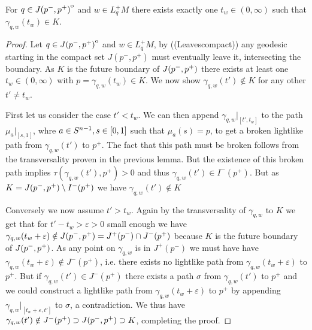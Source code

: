 \begin{lemma}\label{lem:hitsonce}
    For $q\in {\kern0ptJ(p^-,p^+)}^{\mathrm{o}}$ and $w\in L^+_qM$ there exists exactly one $t_w\in (0,\infty)$ such that $\gamma_{q,w}(t_w)\in K$.
\end{lemma}
\begin{proof}
    Let $q\in {\kern0ptJ(p^-,p^+)}^{\mathrm{o}}$ and $w\in L^+_qM$, by ((Leavescompact)) any geodesic starting in the compact set $J(p^-,p^+)$ must eventually leave it, intersecting the boundary. As $K$ is the future boundary of $J(p^-,p^+)$ there exists at least one $t_w\in (0,\infty)$ with $p=\gamma_{q,w}(t_w)\in K$. We now show $\gamma_{q,w}(t')\notin K$ for any other $t'\neq t_w$.

    First let us consider the case $t'<t_w$. We can then append $\gamma_{q,w}\rvert_{[t',t_w]}$ to the path $\mu_a\rvert_{[s,1]}$, whre $a\in {S^{n-1}}, s\in [0,1]$ such that $\mu_a(s)=p$, to get a broken lightlike path from $\gamma_{q,w}(t')$ to $p^+$. The fact that this path must be broken follows from the transversality proven in the previous lemma. But the existence of this broken path implies $\tau(\gamma_{q,w}(t'),p^+)>0$ and thus $\gamma_{q,w}(t')\in I^-(p^+)$. But as $K=J(p^-,p^+)\setminus I^-(p^+)$ we have $\gamma_{q,w}(t')\notin K$

    Conversely we now assume $t'>t_w$. Again by the transversality of $\gamma_{q,w}$ to $K$ we get that for $t'-t_w>\varepsilon>0$ small enough we have $\gamma_{q,w}(t_w+\varepsilon)\notin J(p^-,p^+)=J^+(p^-)\cap J^-(p^+)$ because $K$ is the future boundary of $J(p^-,p^+)$. As any point on $\gamma_{q,w}$ is in $J^+(p^-)$ we must have have $\gamma_{q,w}(t_w+\varepsilon) \notin J^-(p^+)$, i.e. there exists no lightlike path from $\gamma_{q,w}(t_w+\varepsilon)$ to $p^+$. But if $\gamma_{q,w}(t')\in J^-(p^+)$ there exists a path $\sigma$ from $\gamma_{q,w}(t')$ to $p^+$ and we could construct a lightlike path from $\gamma_{q,w}(t_w+\varepsilon)$ to $p^+$ by appending $\gamma_{q,w}\rvert_{[t_w+\varepsilon,t']}$ to  $\sigma$, a contradiction. We thus have $\gamma_{q,w}(t')\notin J^-(p^+)\supset J(p^-,p^+)\supset K$, completing the proof.
\end{proof}


